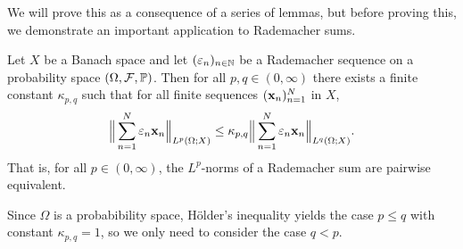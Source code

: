 We will prove this as a consequence of a series of lemmas, but before proving this, we demonstrate an important application to Rademacher sums.

\begin{thm}\label{thm:kk}
  Let $X$ be a Banach space and let $(\varepsilon_{n})_{n \in \mathbb{N}}$ be a Rademacher sequence on a probability space $(\Omega,\mathcal{F},\mathbb{P})$.
  Then for all $p,q \in (0,\infty)$ there exists a finite constant $\kappa_{p,q}$ such that for all finite sequences $(\mathbf{x}_n)_{n=1}^N$ in $X$,
  \begin{equation*}
    \Big\|\sum_{n=1}^{N} \varepsilon_{n} \mathbf{x}_{n} \Big\|_{L^p(\Omega;X)} \leq \kappa_{p,q} \Big\|\sum_{n=1}^{N} \varepsilon_{n} \mathbf{x}_{n} \Big\|_{L^q(\Omega;X)}.
  \end{equation*}
  That is, for all $p \in (0,\infty)$, the $L^p$-norms of a Rademacher sum are pairwise equivalent.  
\end{thm}

Since $\Omega$ is a probabibility space, H\"older's inequality yields the case $p \leq q$ with constant $\kappa_{p,q} = 1$, so we only need to consider the case $q < p$.

